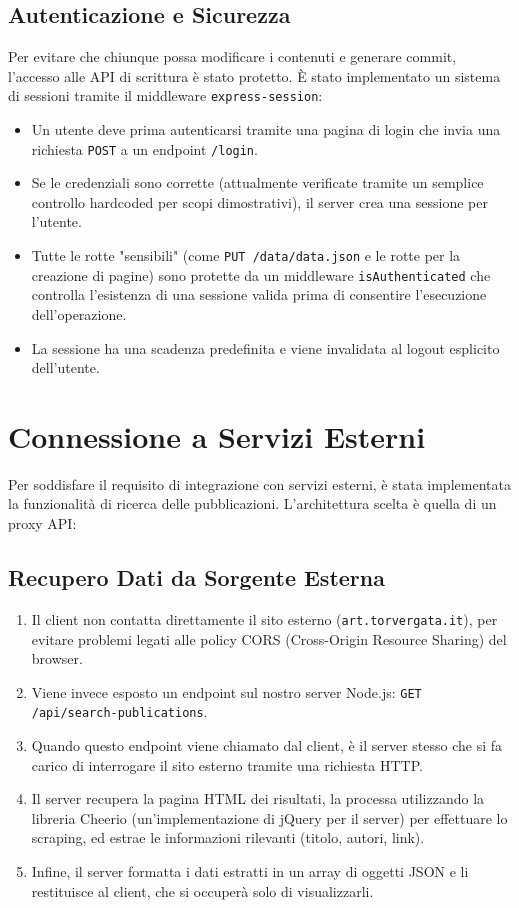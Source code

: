 \subsection{Autenticazione e Sicurezza}
Per evitare che chiunque possa modificare i contenuti e generare commit, l'accesso alle API di scrittura è stato protetto. È stato implementato un sistema di sessioni tramite il middleware \texttt{express-session}:
\begin{itemize}
    \item Un utente deve prima autenticarsi tramite una pagina di login che invia una richiesta \texttt{POST} a un endpoint \texttt{/login}.
    \item Se le credenziali sono corrette (attualmente verificate tramite un semplice controllo hardcoded per scopi dimostrativi), il server crea una sessione per l'utente.
    \item Tutte le rotte "sensibili" (come \texttt{PUT /data/data.json} e le rotte per la creazione di pagine) sono protette da un middleware \texttt{isAuthenticated} che controlla l'esistenza di una sessione valida prima di consentire l'esecuzione dell'operazione.
    \item La sessione ha una scadenza predefinita e viene invalidata al logout esplicito dell'utente.
\end{itemize}

\section{Connessione a Servizi Esterni}
Per soddisfare il requisito di integrazione con servizi esterni, è stata implementata la funzionalità di ricerca delle pubblicazioni. L'architettura scelta è quella di un proxy API:

\subsection{Recupero Dati da Sorgente Esterna}
\begin{enumerate}
    \item Il client non contatta direttamente il sito esterno (\texttt{art.torvergata.it}), per evitare problemi legati alle policy CORS (Cross-Origin Resource Sharing) del browser.
    \item Viene invece esposto un endpoint sul nostro server Node.js: \texttt{GET /api/search-publications}.
    \item Quando questo endpoint viene chiamato dal client, è il server stesso che si fa carico di interrogare il sito esterno tramite una richiesta HTTP.
    \item Il server recupera la pagina HTML dei risultati, la processa utilizzando la libreria Cheerio (un'implementazione di jQuery per il server) per effettuare lo scraping, ed estrae le informazioni rilevanti (titolo, autori, link).
    \item Infine, il server formatta i dati estratti in un array di oggetti JSON e li restituisce al client, che si occuperà solo di visualizzarli.
\end{enumerate}

